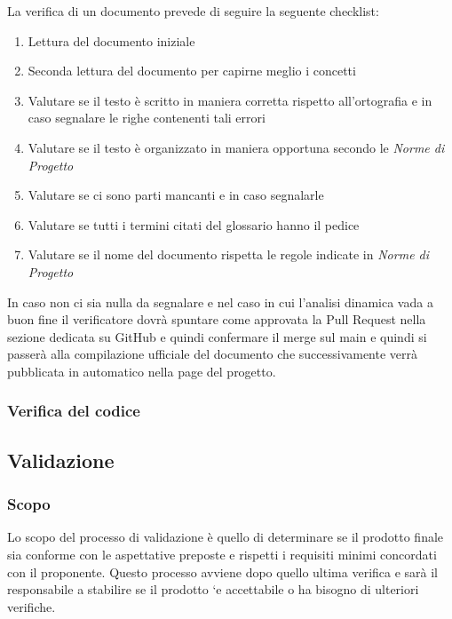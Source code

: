         La verifica di un documento prevede di seguire la seguente checklist:
        \begin{enumerate}
            \item Lettura del documento iniziale
            \item Seconda lettura del documento per capirne meglio i concetti
            \item Valutare se il testo è scritto in maniera corretta rispetto all'ortografia e in caso segnalare le righe contenenti tali errori
            \item Valutare se il testo è organizzato in maniera opportuna secondo le \textit{Norme di Progetto}
            \item Valutare se ci sono parti mancanti e in caso segnalarle
            \item Valutare se tutti i termini citati del glossario hanno il pedice
            \item Valutare se il nome del documento rispetta le regole indicate in \textit{Norme di Progetto}
        \end{enumerate}
        In caso non ci sia nulla da segnalare e nel caso in cui l'analisi dinamica vada a buon fine il verificatore dovrà spuntare come approvata la Pull Request nella
        sezione dedicata su GitHub e quindi confermare il merge sul main e quindi si passerà alla compilazione ufficiale del documento che successivamente
        verrà pubblicata in automatico nella page del progetto.

        \subsubsection{Verifica del codice}
    
    \subsection{Validazione}
        \subsubsection{Scopo}
        Lo scopo del processo di validazione è quello di determinare se il prodotto finale sia conforme con le
        aspettative preposte e rispetti i requisiti minimi concordati con il proponente. Questo processo avviene
        dopo quello ultima verifica e sarà il responsabile a stabilire se il prodotto `e accettabile o ha bisogno di
        ulteriori verifiche.